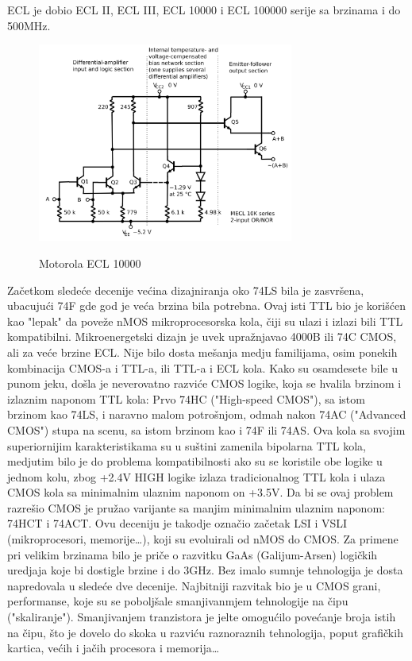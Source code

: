 \documentclass[12pt,a4paper]{article}
\begin{document}
ECL je dobio ECL II, ECL III, ECL 10000 i ECL 100000 serije sa brzinama i do 500MHz.
\begin{figure}
  \centering
  \includegraphics[width=0.75\textwidth]{ECL}
  \caption{Motorola ECL 10000}\cite{ecl}
\end{figure}
Začetkom sledeće decenije većina dizajniranja oko 74LS bila je zasvršena, ubacujući 74F gde god je veća brzina bila potrebna. Ovaj isti TTL bio je korišćen kao "lepak" da poveže nMOS mikroprocesorska kola, čiji su ulazi i izlazi bili TTL kompatibilni. 
Mikroenergetski dizajn je uvek upražnjavao 4000B ili 74C CMOS, ali za veće brzine ECL. 
Nije bilo dosta mešanja medju familijama, osim ponekih kombinacija CMOS-a i TTL-a, ili TTL-a i ECL kola.
Kako su osamdesete bile u punom jeku, došla je neverovatno razviće CMOS logike, koja se hvalila brzinom i izlaznim naponom TTL kola:
Prvo 74HC ("High-speed CMOS"), sa istom brzinom kao 74LS, i naravno malom potrošnjom, odmah nakon 74AC ("Advanced CMOS") stupa na scenu, sa istom brzinom kao i 74F ili 74AS.
Ova kola sa svojim superiornijim karakteristikama su u suštini zamenila bipolarna TTL kola, medjutim bilo je do problema kompatibilnosti ako su se koristile obe logike u jednom kolu, zbog +2.4V HIGH logike izlaza tradicionalnog TTL kola i ulaza CMOS kola sa minimalnim ulaznim naponom on +3.5V. 
Da bi se ovaj problem razrešio CMOS je pružao varijante sa manjim minimalnim ulaznim naponom: 74HCT i 74ACT. 
Ovu deceniju je takodje označio začetak LSI i VSLI (mikroprocesori, memorije\dots), koji su evoluirali od nMOS do CMOS. Za primene pri velikim brzinama bilo je priče o razvitku GaAs (Galijum-Arsen) logičkih uredjaja koje bi dostigle brzine i do 3GHz.
Bez imalo sumnje tehnologija je dosta napredovala u sledeće dve decenije. 
Najbitniji razvitak bio je u CMOS grani, performanse, koje su se poboljšale smanjivanmjem tehnologije na čipu ("skaliranje"). Smanjivanjem tranzistora je jelte omogućilo povećanje broja istih na čipu, što je dovelo do skoka u razviću raznoraznih tehnologija, poput grafičkih kartica, većih i jačih procesora i memorija\dots 
\end{document}
